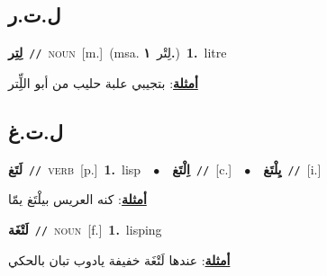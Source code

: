 \documentclass[10pt,a4paper,twoside]{article} %
\begin{document}
\begin{multicols}{2}
\vspace{-3mm}
\subsection*{\color{blue}\foreignlanguage{arabic}{ل.ت.ر}\color{blue}{}} 

{\setlength\topsep{0pt}\textbf{\foreignlanguage{arabic}{لِتِر}}\ {\color{gray}\texttt{//}\color{black}}\ \textsc{noun}\ [m.]\ \color{gray}(msa. \foreignlanguage{arabic}{لِتْر}~\foreignlanguage{arabic}{\textbf{١.}})\color{black}\ \textbf{1.}~litre\  \begin{flushright}\color{gray}\foreignlanguage{arabic}{\textbf{\underline{\foreignlanguage{arabic}{أمثلة}}}: بتجيبي علبة حليب من أبو اللِِّتر}\end{flushright}\color{black}} \vspace{2mm}

\vspace{-3mm}
\subsection*{\color{blue}\foreignlanguage{arabic}{ل.ت.غ}\color{blue}{}} 

{\setlength\topsep{0pt}\textbf{\foreignlanguage{arabic}{لَتَغ}}\ {\color{gray}\texttt{//}\color{black}}\ \textsc{verb}\ [p.]\ \textbf{1.}~lisp\ \ $\bullet$\ \ \setlength\topsep{0pt}\textbf{\foreignlanguage{arabic}{اِلْتَغ}}\ {\color{gray}\texttt{//}\color{black}}\ [c.]\ \ $\bullet$\ \ \setlength\topsep{0pt}\textbf{\foreignlanguage{arabic}{يِلْتَغ}}\ {\color{gray}\texttt{//}\color{black}}\ [i.]\  \begin{flushright}\color{gray}\foreignlanguage{arabic}{\textbf{\underline{\foreignlanguage{arabic}{أمثلة}}}: كنه العريس بيلْتَغ يمّا}\end{flushright}\color{black}} \vspace{2mm}

{\setlength\topsep{0pt}\textbf{\foreignlanguage{arabic}{لَتْغَة}}\ {\color{gray}\texttt{//}\color{black}}\ \textsc{noun}\ [f.]\ \textbf{1.}~lisping\  \begin{flushright}\color{gray}\foreignlanguage{arabic}{\textbf{\underline{\foreignlanguage{arabic}{أمثلة}}}: عندها لَتْغَة خفيفة يادوب تبان بالحكي}\end{flushright}\color{black}} \vspace{2mm}


\end{multicols}
\end{document}
